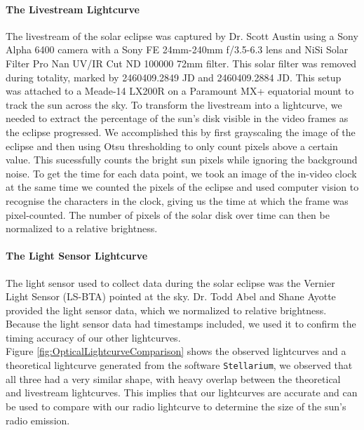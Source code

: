 \paragraph{The Livestream Lightcurve}
The livestream of the solar eclipse was captured by Dr. Scott Austin using a Sony Alpha 6400 camera with a Sony FE 24mm-240mm f/3.5-6.3 lens and NiSi Solar Filter Pro Nan UV/IR Cut ND 100000 72mm filter.
This solar filter was removed during totality, marked by 2460409.2849 JD and 2460409.2884 JD.
This setup was attached to a Meade-14 LX200R on a Paramount MX+ equatorial mount to track the sun across the sky.
To transform the livestream into a lightcurve, we needed to extract the percentage of the sun's disk visible in the video frames as the eclipse progressed.
We accomplished this by first grayscaling the image of the eclipse and then using Otsu thresholding to only count pixels above a certain value.
This sucessfully counts the bright sun pixels while ignoring the background noise.
To get the time for each data point, we took an image of the in-video clock at the same time we counted the pixels of the eclipse and used computer vision to recognise the characters in the clock, giving us the time at which the frame was pixel-counted.
The number of pixels of the solar disk over time can then be normalized to a relative brightness.
\paragraph{The Light Sensor Lightcurve}
The light sensor used to collect data during the solar eclipse was the Vernier Light Sensor (LS-BTA) pointed at the sky.
Dr. Todd Abel and Shane Ayotte provided the light sensor data, which we normalized to relative brightness.
Because the light sensor data had timestamps included, we used it to confirm the timing accuracy of our other lightcurves.
\\
Figure \ref{fig:OpticalLightcurveComparison} shows the observed lightcurves and a theoretical lightcurve generated from the software \texttt{Stellarium}\cite{zotti_simulated_2020}, we observed that all three had a very similar shape, with heavy overlap between the theoretical and livestream lightcurves.
This implies that our lightcurves are accurate and can be used to compare with our radio lightcurve to determine the size of the sun's radio emission.
